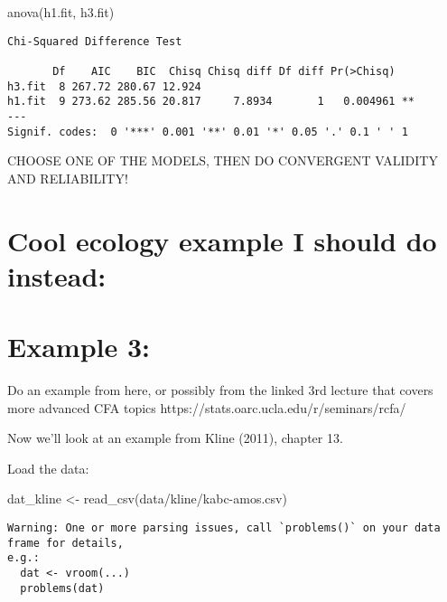 \documentclass[
  letterpaper,
  DIV=11,
  numbers=noendperiod]{scrreprt}
\newenvironment{Shaded}{\begin{snugshade}}{\end{snugshade}}
\newcommand{\FunctionTok}[1]{\textcolor[rgb]{0.28,0.35,0.67}{#1}}
\newcommand{\NormalTok}[1]{\textcolor[rgb]{0.00,0.23,0.31}{#1}}
\newcommand{\OtherTok}[1]{\textcolor[rgb]{0.00,0.23,0.31}{#1}}
\newcommand{\StringTok}[1]{\textcolor[rgb]{0.13,0.47,0.30}{#1}}
\begin{document}
\begin{Shaded}
\begin{Highlighting}[]
\FunctionTok{anova}\NormalTok{(h1.fit, h3.fit)}
\end{Highlighting}
\end{Shaded}

\begin{verbatim}
Chi-Squared Difference Test

       Df    AIC    BIC  Chisq Chisq diff Df diff Pr(>Chisq)   
h3.fit  8 267.72 280.67 12.924                                 
h1.fit  9 273.62 285.56 20.817     7.8934       1   0.004961 **
---
Signif. codes:  0 '***' 0.001 '**' 0.01 '*' 0.05 '.' 0.1 ' ' 1
\end{verbatim}

CHOOSE ONE OF THE MODELS, THEN DO CONVERGENT VALIDITY AND RELIABILITY!

\hypertarget{cool-ecology-example-i-should-do-instead}{%
\section{Cool ecology example I should do
instead:}\label{cool-ecology-example-i-should-do-instead}}

\hypertarget{example-3}{%
\section{Example 3:}\label{example-3}}

Do an example from here, or possibly from the linked 3rd lecture that
covers more advanced CFA topics
https://stats.oarc.ucla.edu/r/seminars/rcfa/

Now we'll look at an example from Kline (2011), chapter 13.

Load the data:

\begin{Shaded}
\begin{Highlighting}[]
\NormalTok{dat\_kline }\OtherTok{\textless{}{-}} \FunctionTok{read\_csv}\NormalTok{(}\StringTok{\textquotesingle{}data/kline/kabc{-}amos.csv\textquotesingle{}}\NormalTok{)}
\end{Highlighting}
\end{Shaded}

\begin{verbatim}
Warning: One or more parsing issues, call `problems()` on your data frame for details,
e.g.:
  dat <- vroom(...)
  problems(dat)
\end{verbatim}
\end{document}
